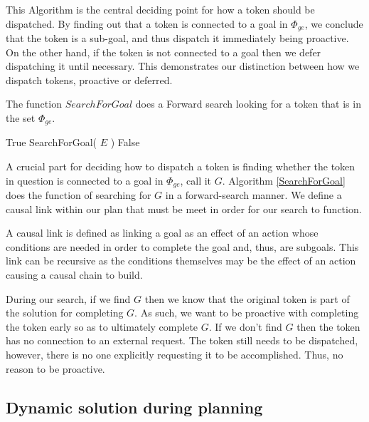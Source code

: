 This Algorithm is the central deciding point for how a
token should be dispatched. By finding out that a token is connected
to a goal in $\Phi_{ge}$, we conclude that the token is a sub-goal,
and thus dispatch it immediately being proactive.  On the other hand,
if the token is not connected to a goal then we defer dispatching it
until necessary.  This demonstrates our distinction between how we
dispatch tokens, proactive or deferred.

\begin{algorithm}
\caption{The function $SearchForGoal$ does a Forward search looking for a token that is
in the set $\Phi_{ge}$.}
\label{SearchForGoal}
\begin{algorithmic}
			\State \Return True
			\State \Return SearchForGoal( $E$ )
		\Else 
			\State \Return False
		\EndIf
	\EndFor
\EndFor
\EndFunction
\end{algorithmic}
\end{algorithm}

A crucial part for deciding how to dispatch a token is finding whether the token in question is 
connected to a goal in $\Phi_{ge}$, call it $G$. Algorithm \ref{SearchForGoal} does the function of 
searching for $G$ in a forward-search manner. We define a causal link within our plan that must be
meet in order for our search to function. 
\begin{definition}
\label{def:subgoalLink}
A causal link is defined as linking a goal as an effect of an action whose conditions are needed in order
to complete the goal and, thus, are subgoals. This link can be recursive as the conditions themselves 
may be the effect of an action causing a causal chain to build.
\end{definition}
During our search, if we find $G$ then we know that the original token
is part of the solution for completing $G$.  As such, we want to be
proactive with completing the token early so as to ultimately complete
$G$. If we don't find $G$ then the token has no connection to an
external request. The token still needs to be dispatched, however,
there is no one explicitly requesting it to be accomplished. Thus, no
reason to be proactive.

\subsection{Dynamic solution during planning}

